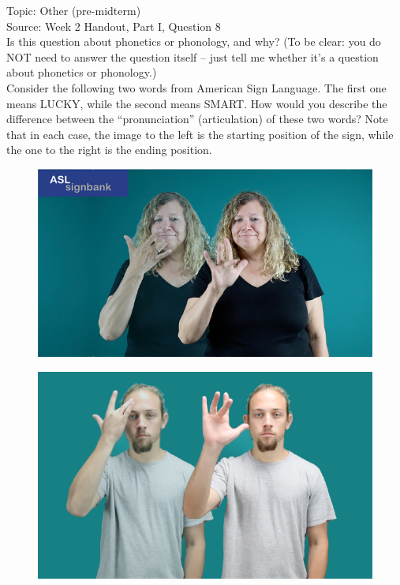 \documentclass[12pt]{article}
\begin{document}
Topic: Other (pre-midterm)\\
Source: Week 2 Handout, Part I, Question 8\\

Is this question about phonetics or phonology, and why? (To be clear: you do NOT need to answer the question itself -- just tell me whether it's a question about phonetics or phonology.)\\

Consider the following two words from American Sign Language. The first one means LUCKY, while the second means SMART. How would you describe the difference between the ``pronunciation'' (articulation) of these two words? Note that in each case, the image to the left is the starting position of the sign, while the one to the right is the ending position.

\begin{figure}[H]
\includegraphics{../images/asl_lucky.png}
\end{figure}
\begin{figure}[H]
\includegraphics{../images/asl_smart.png}
\end{figure}
\end{document}
